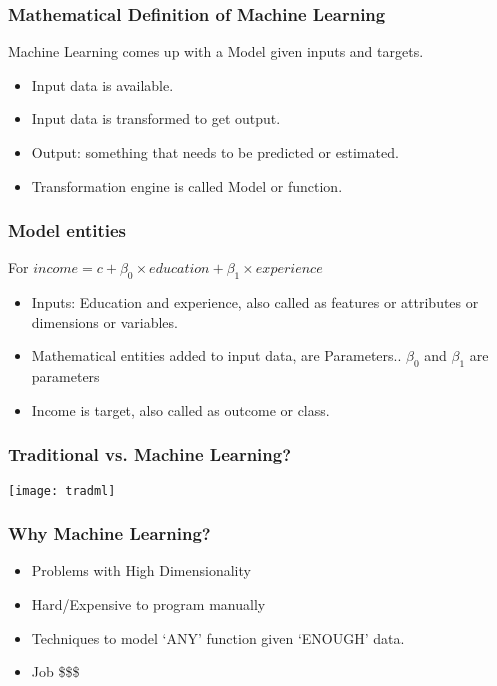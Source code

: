 \begin{frame}[fragile]\frametitle{Mathematical Definition of Machine Learning}
Machine Learning comes up with a Model given inputs and targets.

\begin{itemize}
\item Input data is available. 
\item Input data is transformed to get output.
\item Output: something that needs to be predicted or estimated.
\item Transformation engine is called Model or function.
\end{itemize}
\end{frame}

\begin{frame}[fragile]\frametitle{Model entities}
For $income = c + \beta_0 \times education + \beta_1 \times experience$
\begin{itemize}
\item Inputs: Education and experience, also called as features or attributes or dimensions or variables.
\item Mathematical entities added to input data, are Parameters.. $\beta_0$ and $\beta_1$ are parameters
\item Income is target, also called as outcome or class.
\end{itemize}
\end{frame}

\begin{frame}[fragile]\frametitle{Traditional vs. Machine Learning?}
\begin{center}
\texttt{[image: tradml]}
\end{center}
\end{frame}

\begin{frame}[fragile]\frametitle{Why Machine Learning?}
\begin{itemize}
\item Problems with High Dimensionality
\item Hard/Expensive to program manually
\item Techniques to model `ANY' function given `ENOUGH' data.
\item Job \$\$\$
\end{itemize}
\end{frame}

